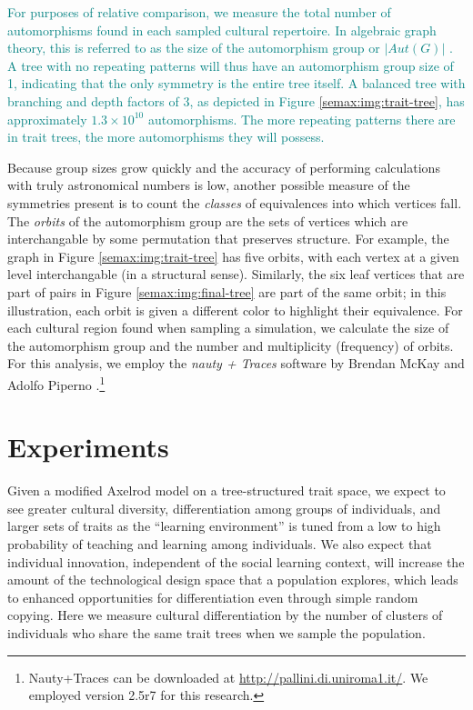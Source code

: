 \textcolor{teal}{For purposes of relative comparison, we measure the total number of automorphisms found in each sampled cultural repertoire.  In algebraic graph theory, this is referred to as the size of the automorphism group or $|\textit{Aut}(G)|$
\citep{godsil2001algebraic}. A tree with no repeating patterns will thus
have an automorphism group size of 1, indicating that the only symmetry
is the entire tree itself. A balanced tree with branching and depth
factors of 3, as depicted in Figure \ref{semax:img:trait-tree}, has
approximately $1.3 \times 10^{10}$ automorphisms. The more repeating
patterns there are in trait trees, the more automorphisms they will
possess.}

Because group sizes grow quickly and the accuracy of performing
calculations with truly astronomical numbers is low, another possible
measure of the symmetries present is to count the \emph{classes} of
equivalences into which vertices fall. The \emph{orbits} of the
automorphism group are the sets of vertices which are interchangable by
some permutation that preserves structure. For example, the graph in
Figure \ref{semax:img:trait-tree} has five orbits, with each vertex at a given
level interchangable (in a structural sense). Similarly, the six leaf
vertices that are part of pairs in Figure \ref{semax:img:final-tree} are part
of the same orbit; in this illustration, each orbit is given a different
color to highlight their equivalence. For each cultural region found
when sampling a simulation, we calculate the size of the automorphism
group and the number and multiplicity (frequency) of orbits. For this
analysis, we employ the \emph{nauty + Traces} software by Brendan McKay
and Adolfo Piperno \citep{McKay201494}.\footnote{Nauty+Traces can be
  downloaded at \url{http://pallini.di.uniroma1.it/}. We employed
  version 2.5r7 for this research.}

\section{Experiments}\label{semax:sec:experiments}

Given a modified Axelrod model on a tree-structured trait space, we
expect to see greater cultural diversity, differentiation among groups
of individuals, and larger sets of traits as the ``learning
environment'' is tuned from a low to high probability of teaching and
learning among individuals. We also expect that individual innovation,
independent of the social learning context, will increase the amount of
the technological design space that a population explores, which leads
to enhanced opportunities for differentiation even through simple random
copying. Here we measure cultural differentiation by the number of
clusters of individuals who share the same trait trees when we sample
the population.

